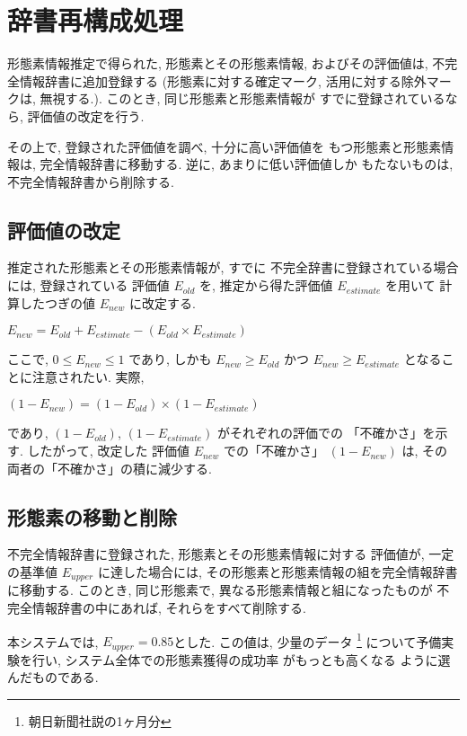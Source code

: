 \section{辞書再構成処理} 
形態素情報推定で得られた, 
形態素とその形態素情報, 
およびその評価値は, 
不完全情報辞書に追加登録する
(形態素に対する確定マーク, 活用に対する除外マークは, 無視する.). 
このとき, 同じ形態素と形態素情報が
すでに登録されているなら, 評価値の改定を行う.
 

その上で, 登録された評価値を調べ, 十分に高い評価値を
もつ形態素と形態素情報は, 
完全情報辞書に移動する. 逆に, あまりに低い評価値しか
もたないものは, 不完全情報辞書から削除する. 


\subsection{評価値の改定}
\label{sin_hyouka}
推定された形態素とその形態素情報が, すでに
不完全辞書に登録されている場合には, 登録されている
評価値 $E_{old}$ を, 推定から得た評価値 $E_{estimate}$ を用いて
計算したつぎの値 $E_{new}$ に改定する. 

\begin{center}
  $E_{new} = E_{old} + E_{estimate} - (E_{old} \times E_{estimate}) $
\end{center}

ここで, $0 \leq E_{new} \leq 1$ であり, しかも $E_{new} \geq
E_{old}$ かつ $E_{new} \geq E_{estimate} $ 
となることに注意されたい. 実際, 
\begin{center}
  $(1 - E_{new}) = (1 - E_{old}) \times (1 - E_{estimate})  $
\end{center}
であり, $(1 - E_{old})$, $(1 - E_{estimate})$ がそれぞれの評価での
「不確かさ」を示す. したがって, 改定した
評価値 $E_{new}$ での「不確かさ」 $(1 - E_{new})$ は, 
その両者の「不確かさ」の積に減少する. 

\vspace{-0,5mm}
\subsection{形態素の移動と削除}
\vspace{-0,5mm}
不完全情報辞書に登録された, 形態素とその形態素情報に対する
評価値が, 一定の基準値 $E_{upper}$ に達した場合には, 
その形態素と形態素情報の組を完全情報辞書に移動する. 
このとき, 同じ形態素で, 異なる形態素情報と組になったものが
不完全情報辞書の中にあれば, それらをすべて削除する. 

本システムでは,  $E_{upper} = 0.85 $とした. この値は, 
少量のデータ
\footnote{朝日新聞社説の1ヶ月分}
について予備実験を行い, 
システム全体での形態素獲得の成功率
がもっとも高くなる
ように選んだものである. 

